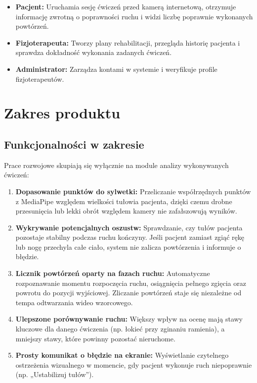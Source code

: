 \documentclass[11pt,a4paper]{article}
\begin{document}
\begin{itemize}
    \item \textbf{Pacjent:} Uruchamia sesję ćwiczeń przed kamerą internetową, otrzymuje informację zwrotną o poprawności ruchu i widzi liczbę poprawnie wykonanych powtórzeń.
    \item \textbf{Fizjoterapeuta:} Tworzy plany rehabilitacji, przegląda historię pacjenta i sprawdza dokładność wykonania zadanych ćwiczeń.
    \item \textbf{Administrator:} Zarządza kontami w systemie i weryfikuje profile fizjoterapeutów.
\end{itemize}

\section{Zakres produktu}

\subsection{Funkcjonalności w zakresie}
Prace rozwojowe skupiają się wyłącznie na module analizy wykonywanych ćwiczeń:

\begin{enumerate}
    \item \textbf{Dopasowanie punktów do sylwetki:}
    Przeliczanie współrzędnych punktów z MediaPipe względem wielkości tułowia pacjenta, dzięki czemu drobne przesunięcia lub lekki obrót względem kamery nie zafałszowują wyników.
    
    \item \textbf{Wykrywanie potencjalnych oszustw:}
    Sprawdzanie, czy tułów pacjenta pozostaje stabilny podczas ruchu kończyny. Jeśli pacjent zamiast zgiąć rękę lub nogę przechyla całe ciało, system nie zalicza powtórzenia i informuje o błędzie.
    
    \item \textbf{Licznik powtórzeń oparty na fazach ruchu:}
    Automatyczne rozpoznawanie momentu rozpoczęcia ruchu, osiągnięcia pełnego zgięcia oraz powrotu do pozycji wyjściowej. Zliczanie powtórzeń staje się niezależne od tempa odtwarzania wideo wzorcowego.
    
    \item \textbf{Ulepszone porównywanie ruchu:}
    Większy wpływ na ocenę mają stawy kluczowe dla danego ćwiczenia (np. łokieć przy zginaniu ramienia), a mniejszy stawy, które powinny pozostać nieruchome.
    
    \item \textbf{Prosty komunikat o błędzie na ekranie:}
    Wyświetlanie czytelnego ostrzeżenia wizualnego w momencie, gdy pacjent wykonuje ruch niepoprawnie (np. „Ustabilizuj tułów”).
\end{enumerate}
\end{document}
